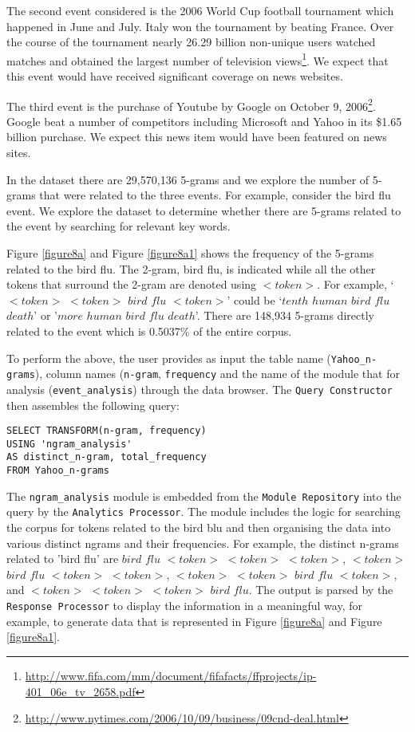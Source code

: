 \documentclass[10pt, conference, compsocconf]{IEEEtran}
\begin{document}
The second event considered is the 2006 World Cup football tournament which happened in June and July. Italy won the tournament by beating France. Over the course of the tournament nearly 26.29 billion non-unique users watched matches and obtained the largest number of television views\footnote{\url{http://www.fifa.com/mm/document/fifafacts/ffprojects/ip-401_06e_tv_2658.pdf}}. We expect that this event would have received significant coverage on news websites.    

The third event is the purchase of Youtube by Google on October 9, 2006\footnote{\url{http://www.nytimes.com/2006/10/09/business/09cnd-deal.html}}. Google beat a number of competitors including Microsoft and Yahoo in its \$1.65 billion purchase. We expect this news item would have been featured on news sites. 

In the dataset there are 29,570,136 5-grams and we explore the number of 5-grams that were related to the three events. For example, consider the bird flu event. We explore the dataset to determine whether there are 5-grams related to the event by searching for relevant key words. 

Figure \ref{figure8a} and Figure \ref{figure8a1} shows the frequency of the 5-grams related to the bird flu. The 2-gram, bird flu, is indicated while all the other tokens that surround the 2-gram are denoted using $<token>$. For example, `$<token>$ $<token>$ $bird$ $flu$ $<token>$' could be `$tenth$ $human$ $bird$ $flu$ $death$' or '$more$ $human$ $bird$ $flu$ $death$'. There are 148,934 5-grams directly related to the event which is 0.5037\% of the entire corpus.

To perform the above, the user provides as input the table name (\texttt{Yahoo\_n-grams}), column names (\texttt{n-gram}, \texttt{frequency} and the name of the module that for analysis (\texttt{event\_analysis}) through the data browser. The \texttt{Query Constructor} then assembles the following query:

\begin{verbatim}
SELECT TRANSFORM(n-gram, frequency)
USING 'ngram_analysis' 
AS distinct_n-gram, total_frequency
FROM Yahoo_n-grams
\end{verbatim}

The \texttt{ngram\_analysis} module is embedded from the \texttt{Module Repository} into the query by the \texttt{Analytics Processor}. The module includes the logic for searching the corpus for tokens related to the bird blu and then organising the data into various distinct ngrams and their frequencies. For example, the distinct n-grams related to 'bird flu' are $bird$ $flu$ $<token>$ $<token>$ $<token>$, $<token>$ $bird$ $flu$ $<token>$ $<token>$, $<token>$ $<token>$ $bird$ $flu$ $<token>$, and $<token>$ $<token>$ $<token>$ $bird$ $flu$. The output is parsed by the \texttt{Response Processor} to display the information in a meaningful way, for example, to generate data that is represented in Figure \ref{figure8a} and Figure \ref{figure8a1}. 
\end{document}
